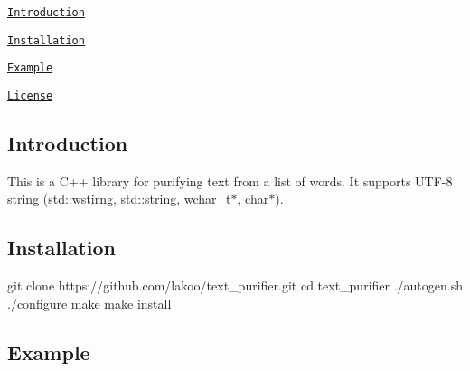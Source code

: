 
\begin{DoxyItemize}
\item \href{#introduction}{\tt Introduction}
\item \href{#installation}{\tt Installation}
\item \href{#example}{\tt Example}
\item \href{#license}{\tt License}
\end{DoxyItemize}

\subsection*{Introduction}

This is a C++ library for purifying text from a list of words. It supports U\+T\+F-\/8 string (std\+::wstirng, std\+::string, wchar\+\_\+t$\ast$, char$\ast$).

\subsection*{Installation}


\begin{DoxyCode}
git clone https://github.com/lakoo/text\_purifier.git
cd text\_purifier
./autogen.sh
./configure
make
make install
\end{DoxyCode}


\subsection*{Example}


